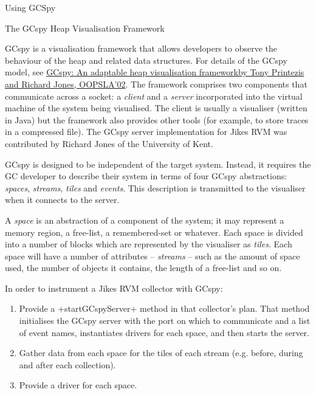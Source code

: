\begin{section}{Using GCSpy}
\label{sec:usinggcspy}

\begin{subsection}{The GCspy Heap Visualisation Framework}

GCspy is a visualisation framework that allows developers to observe the behaviour of the heap and related data structures. For details of the GCspy model, see \href{http://www.cs.kent.ac.uk/pubs/2002/1426/}{GCspy: An adaptable heap visualisation frameworkby Tony Printezis and Richard Jones, OOPSLA'02}. The framework comprises two components that communicate across a socket: a \textit{client} and a \textit{server} incorporated into the virtual machine of the system being visualised. The client is usually a visualiser (written in Java) but the framework also provides other tools (for example, to store traces in a compressed file). The GCspy server implementation for Jikes RVM was contributed by Richard Jones of the University of Kent.

GCspy is designed to be independent of the target system. Instead, it requires the GC developer to describe their system in terms of four GCspy abstractions: \textit{spaces}, \textit{streams}, \textit{tiles} and \textit{events}. This description is transmitted to the visualiser when it connects to the server.

A \textit{space} is an abstraction of a component of the system; it may represent a memory region, a free-list, a remembered-set or whatever. Each space is divided into a number of blocks which are represented by the visualiser as \textit{tiles}. Each space will have a number of attributes -- \textit{streams} -- such as the amount of space used, the number of objects it contains, the length of a free-list and so on.

In order to instrument a Jikes RVM collector with GCspy:
\begin{enumerate}
  \item Provide a \spverb+startGCspyServer+ method in that collector's plan. That method initialises the GCspy server with the port on which to communicate and a list of event names, instantiates drivers for each space, and then starts the server.
  \item Gather data from each space for the tiles of each stream (e.g. before, during and after each collection).
  \item Provide a driver for each space.
\end{enumerate}


\end{subsection}
\end{section}
